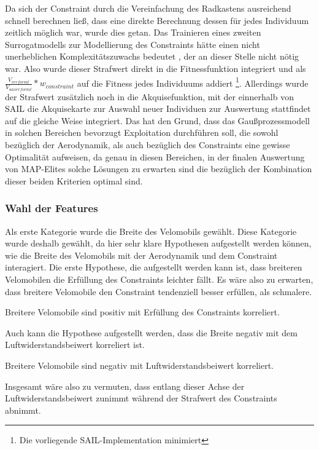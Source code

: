 Da sich der Constraint durch die Vereinfachung des Radkastens ausreichend schnell berechnen ließ, dass eine direkte Berechnung dessen für jedes Individuum zeitlich möglich war, wurde dies getan.
Das Trainieren eines zweiten Surrogatmodells zur Modellierung des Constraints hätte einen nicht unerheblichen Komplexitätszuwachs bedeutet , der an dieser Stelle nicht nötig war.
Also wurde dieser Strafwert direkt in die Fitnessfunktion integriert und als $\frac{V_{verformt}}{V_{unverformt}} * w_{constraint}$ auf die Fitness jedes Individuums addiert
\footnote{Die vorliegende SAIL-Implementation minimiert}.
Allerdings wurde der Strafwert zusätzlich noch in die Akquisefunktion, mit der einnerhalb von SAIL die Akquisekarte zur Auswahl neuer Individuen zur Auswertung stattfindet auf die gleiche Weise integriert. Das hat den Grund, dass das Gaußprozessmodell in solchen Bereichen bevorzugt Exploitation durchführen soll, die sowohl bezüglich der Aerodynamik, als auch bezüglich des Constraints eine gewisse Optimalität aufweisen, da genau in diesen Bereichen, in der finalen Auswertung von MAP-Elites solche Lösungen zu erwarten sind die bezüglich der Kombination dieser beiden Kriterien optimal sind.


\subsubsection{Wahl der Features}

Als erste Kategorie wurde die Breite des Velomobils gewählt.
Diese Kategorie wurde deshalb gewählt, da hier sehr klare Hypothesen aufgestellt werden können, wie die Breite des Velomobils mit der Aerodynamik und dem Constraint interagiert.
Die erste Hypothese, die aufgestellt werden kann ist, dass breiteren Velomobilen die Erfüllung des Constraints leichter fällt. Es wäre also zu erwarten, dass breitere Velomobile den Constraint tendenziell besser erfüllen, als schmalere.
\begin{center}
	Breitere Velomobile sind positiv mit Erfüllung des Constraints korreliert.
\end{center}
Auch kann die Hypothese aufgestellt werden, dass die Breite negativ mit dem Luftwiderstandsbeiwert korreliert ist.
\begin{center}
	Breitere Velomobile sind negativ mit Luftwiderstandsbeiwert korreliert.
\end{center}
Insgesamt wäre also zu vermuten, dass entlang dieser Achse der Luftwiderstandsbeiwert zunimmt während der Strafwert des Constraints abnimmt.

